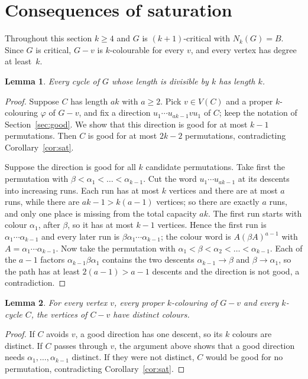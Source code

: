\documentclass[11pt]{article}
\newtheorem{lemma}{Lemma}
\theoremstyle{remark}
\begin{document}
\section{Consequences of saturation}\label{sec:general}

Throughout this section $k\ge4$ and $G$ is $(k+1)$-critical with $N_k(G)=B$. Since $G$ is
critical, $G-v$ is $k$-colourable for every $v$, and every vertex has degree at
least~$k$.

\begin{lemma}\label{lem:short}
Every cycle of $G$ whose length is divisible by $k$ has length $k$.
\end{lemma}

\begin{proof}
Suppose $C$ has length $ak$ with $a\ge2$. Pick $v\in V(C)$ and a proper
$k$-colouring $\varphi$ of $G-v$, and fix a direction
$u_1\cdots u_{ak-1}vu_1$ of $C$; keep the notation of Section~\ref{sec:good}.
We show that this direction is good for at most $k-1$ permutations. Then $C$ is
good for at most $2k-2$ permutations, contradicting
Corollary~\ref{cor:sat}.

Suppose the direction is good for all $k$ candidate permutations. Take first the
permutation with $\beta<\alpha_1<\dots<\alpha_{k-1}$. Cut the word
$u_1\cdots u_{ak-1}$ at its descents into increasing runs. Each run has at most
$k$ vertices and there are at most $a$ runs, while there are $ak-1>k(a-1)$
vertices; so there are exactly $a$ runs, and only one place is missing from
the total capacity $ak$. The first run starts with colour $\alpha_1$, after
$\beta$, so it has at most $k-1$ vertices. Hence the first run is
$\alpha_1\cdots\alpha_{k-1}$ and every later run is
$\beta\alpha_1\cdots\alpha_{k-1}$; the colour word is
$A(\beta A)^{a-1}$ with $A=\alpha_1\cdots\alpha_{k-1}$. Now take the
permutation with $\alpha_1<\beta<\alpha_2<\dots<\alpha_{k-1}$. Each of the
$a-1$ factors $\alpha_{k-1}\beta\alpha_1$ contains the two descents
$\alpha_{k-1}\to\beta$ and $\beta\to\alpha_1$, so the path has at least
$2(a-1)>a-1$ descents and the direction is not good, a contradiction.
\end{proof}

\begin{lemma}\label{lem:rainbow}
For every vertex $v$, every proper $k$-colouring of $G-v$ and every $k$-cycle
$C$, the vertices of $C-v$ have distinct colours.
\end{lemma}

\begin{proof}
If $C$ avoids $v$, a good direction has one descent, so its $k$ colours are
distinct. If $C$ passes through $v$, the argument above shows that a good
direction needs $\alpha_1,\dots,\alpha_{k-1}$ distinct. If they were not
distinct, $C$ would be good for no permutation, contradicting
Corollary~\ref{cor:sat}.
\end{proof}
\end{document}
